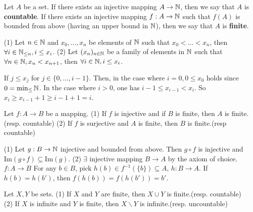 \documentclass{book}
\numberwithin{equation}{section}
\begin{document}
\begin{definitionenv}
    Let $A$ be a set. If there exists an injective mapping $A\rightarrow \mathbb{N}$,  then we say that $A$ is \textbf{countable}.
    If  there exists an injective mapping $f:A\rightarrow \mathbb{N}$ such that $f(A)$ is bounded from above (having an upper bound in $\mathbb{N}$),  then we say that $A$ is \textbf{finite}.
\end{definitionenv}
\begin{lemmaenv}\label{4.9.8}
    \quad
    \newline
    (1) Let $n\in \mathbb{N}$ and $x_0, \dots , x_n$ be elements of $\mathbb{N}$ such that $x_0<\dots<x_n$,  then $\forall i\in \mathbb{N}_{\leq n}, i\leq x_i$.
    \newline
    (2) Let $(x_n)_{n\in \mathbb{N}}$ be a family of elements in $\mathbb{N}$ such that $\forall n\in \mathbb{N}, x_n<x_{n+1}$,  then $\forall i\in \mathbb{N}, i\le x_i$.
\end{lemmaenv}
\begin{proofenv}
    If $j\le x_j$ for $j\in \{0, \dots, i-1\}$. Then,  in the case where $i=0, 0\le x_0$ holds since $0=\min_\le \mathbb{N}$. In the case where $i>0$,  one has $i-1\le x_{i-1}<x_i$. So $x_i\ge x_{i-1}+1\ge i-1+1=i$.
\end{proofenv}
\begin{propositionenv}
    Let $f:A\rightarrow B$ be a mapping.
    \newline
    (1) If $f$ is injective and if $B$ is finite,  then $A$ is finite.(resp. countable)
    \newline
    (2) If $f$ is surjective and $A$ is finite,  then $B$ is finite.(resp countable)
\end{propositionenv}
\begin{proofenv}
    \quad
    \newline
    (1) Let $g:B\rightarrow \mathbb{N}$ injective and bounded from above. Then $g\circ f$ is injective and $\mathrm{Im}(g\circ f)\subseteq \mathrm{Im}(g)$.
    \newline
    (2) $\exists$ injective mapping $B\rightarrow A$ by the axiom of choice. $f:A\rightarrow B$ For any $b\in B$,  pick $h(b)\in f^{-1}(\{b\})\subseteq A$, $h:B\rightarrow A$. If $h(b)=h(b')$,  then $f(h(b))=f(h(b'))=b'$.
\end{proofenv}
\begin{propositionenv}
    Let $X, Y$ be sets.
    \newline
    (1) If $X$ and $Y$ are finite,  then $X\cup Y$ is finite.(resp. countable)
    \newline
    (2) If $X$ is infinite and $Y$ is finite,  then $X\backslash Y$ is infinite.(resp. uncountable)
\end{propositionenv}
\end{document}
